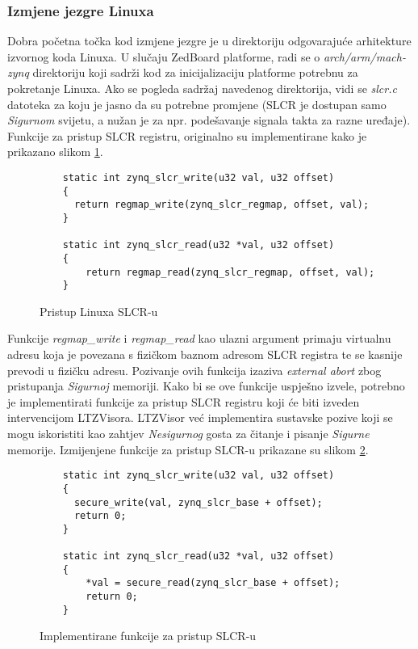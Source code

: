 \documentclass[times, utf8, diplomski, numeric]{fer}
\begin{document}
\subsubsection{Izmjene jezgre Linuxa}
Dobra početna točka kod izmjene jezgre je u direktoriju odgovarajuće arhitekture izvornog koda Linuxa. U slučaju ZedBoard
platforme, radi se o \textit{arch/arm/mach-zynq} direktoriju koji sadrži kod za inicijalizaciju platforme potrebnu za
pokretanje Linuxa. Ako se pogleda sadržaj navedenog direktorija, vidi se \textit{slcr.c} datoteka za koju je jasno da su
potrebne promjene (SLCR je dostupan samo \textit{Sigurnom} svijetu, a nužan je za npr. podešavanje signala takta za razne uređaje).
Funkcije za pristup SLCR registru, originalno su implementirane kako je prikazano slikom \ref{slcr_orig}.

\begin{figure}[H]
  \begin{lstlisting}
    static int zynq_slcr_write(u32 val, u32 offset)
    {
      return regmap_write(zynq_slcr_regmap, offset, val);
    }

    static int zynq_slcr_read(u32 *val, u32 offset)
    {
    	return regmap_read(zynq_slcr_regmap, offset, val);
    }
  \end{lstlisting}
  \caption{Pristup Linuxa SLCR-u}
  \label{slcr_orig}
\end{figure}

Funkcije \textit{regmap\_write} i \textit{regmap\_read} kao ulazni argument primaju virtualnu adresu koja je povezana s fizičkom
baznom adresom SLCR registra te se kasnije prevodi u fizičku adresu. Pozivanje ovih funkcija izaziva \textit{external abort}
zbog pristupanja \textit{Sigurnoj} memoriji. Kako bi se ove funkcije uspješno izvele, potrebno je implementirati funkcije za pristup
SLCR registru koji će biti izveden intervencijom LTZVisora. LTZVisor već implementira sustavske pozive koji se mogu iskoristiti
kao zahtjev \textit{Nesigurnog} gosta za čitanje i pisanje \textit{Sigurne} memorije. Izmijenjene funkcije za pristup SLCR-u prikazane su slikom \ref{slcr_secure}.

\begin{figure}[H]
  \lstset{breaklines=true}
  \begin{lstlisting}
    static int zynq_slcr_write(u32 val, u32 offset)
    {
      secure_write(val, zynq_slcr_base + offset);
      return 0;
    }

    static int zynq_slcr_read(u32 *val, u32 offset)
    {
    	*val = secure_read(zynq_slcr_base + offset);
    	return 0;
    }
  \end{lstlisting}
  \caption{Implementirane funkcije za pristup SLCR-u}
  \label{slcr_secure}
\end{figure}
\end{document}
